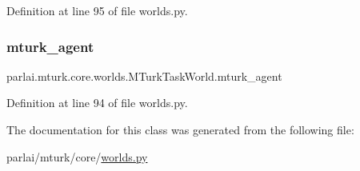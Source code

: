 Definition at line 95 of file worlds.\+py.

\mbox{\label{classparlai_1_1mturk_1_1core_1_1worlds_1_1MTurkTaskWorld_ae9fb1250e0b9a2f77efa255458e47fb3}} 
\subsubsection{\texorpdfstring{mturk\+\_\+agent}{mturk\_agent}}
{\footnotesize\ttfamily parlai.\+mturk.\+core.\+worlds.\+M\+Turk\+Task\+World.\+mturk\+\_\+agent}



Definition at line 94 of file worlds.\+py.



The documentation for this class was generated from the following file\+:\begin{DoxyCompactItemize}
\item 
parlai/mturk/core/\hyperlink{parlai_2mturk_2core_2worlds_8py}{worlds.\+py}\end{DoxyCompactItemize}

